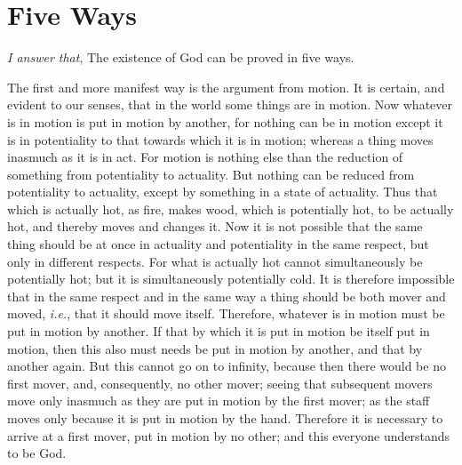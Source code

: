 
\author{Thomas Aquinas}
\chapter{Five Ways}

\textit{I answer that}, The existence of God can be proved in
five ways.

The first and more manifest way is the argument from motion. It is
certain, and evident to our senses, that in the world some things are
in motion. Now whatever is in motion is put in motion by another, for
nothing can be in motion except it is in potentiality to that towards
which it is in motion; whereas a thing moves inasmuch as it is in act.
For motion is nothing else than the reduction of something from
potentiality to actuality. But nothing can be reduced from
potentiality to actuality, except by something in a state of
actuality. Thus that which is actually hot, as fire, makes wood, which
is potentially hot, to be actually hot, and thereby moves and changes
it. Now it is not possible that the same thing should be at once in
actuality and potentiality in the same  respect, but only in
different respects. For what is actually hot cannot simultaneously be
potentially hot; but it is simultaneously potentially cold. It is
therefore impossible that in the same respect and in the same way a
thing should be both mover and moved, \textit{i.e.}, that it should
move itself. Therefore, whatever is in motion must be put in motion by
another. If that by which it is put in motion be itself put in motion,
then this also must needs be put in motion by another, and that by
another again. But this cannot go on to infinity, because then there
would be no first mover, and, consequently, no other mover; seeing
that subsequent movers move only inasmuch as they are put in motion by
the first mover; as the staff moves only because it is put in motion
by the hand. Therefore it is necessary to arrive at a first mover, put
in motion by no other; and this everyone understands to be God.

